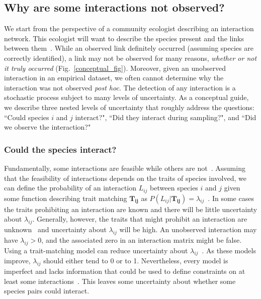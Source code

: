\documentclass[12pt]{article}
\begin{document}
\begin{spacing}{2.0}


    \subsection*{Why are some interactions not observed?}

      We start from the perspective of a community ecologist describing an interaction network. This ecologist will want to describe the species present and the links between them~\citep{Roslin2016}. While an observed link definitely occurred (assuming species are correctly identified), a link may not be observed for many reasons, \emph{whether or not it truly occurred} (Fig.~\ref{conceptual_fig}). Moreover, given an unobserved interaction in an empirical dataset, we often cannot determine why the interaction was not observed \emph{post hoc}. The detection of any interaction is a stochastic process subject to many levels of uncertainty. As a conceptual guide, we describe three nested levels of uncertainty that roughly address the questions: ``Could species $i$ and $j$ interact?", ``Did they interact during sampling?", and ``Did we observe the interaction?"


        \subsubsection*{Could the species interact?} 

          Fundamentally, some interactions are feasible while others are not~\citep{Poisot2015}. Assuming that the feasibility of interactions depends on the traits of species involved, we can define the probability of an interaction $L_{ij}$ between species $i$ and $j$ given some function describing trait matching $\mathbf{T_{ij}}$ as $P(L_{ij}|\mathbf{T_{ij}})=\lambda_{ij}$~\citep{Bartomeus2013,Gravel2013,Weinstein2017}. In some cases the traits prohibiting an interaction are known and there will be little uncertainty about $\lambda_{ij}$. Generally, however, the traits that might prohibit an interaction are unknown~\citep{Dormann2017} and uncertainty about $\lambda_{ij}$ will be high. 
          An unobserved interaction may have $\lambda_{ij}>0$, and the associated zero in an interaction matrix might be false. Using a trait-matching model can reduce uncertainty about $\lambda_{ij}$~\citep{Jordano2016}. As these models improve, $\lambda_{ij}$ should either tend to 0 or to 1. Nevertheless, every model is imperfect and lacks information that could be used to define constraints on at least some interactions~\citep{Dormann2017}. This leaves some uncertainty about whether some species pairs could interact.



\end{spacing}
\end{document}
